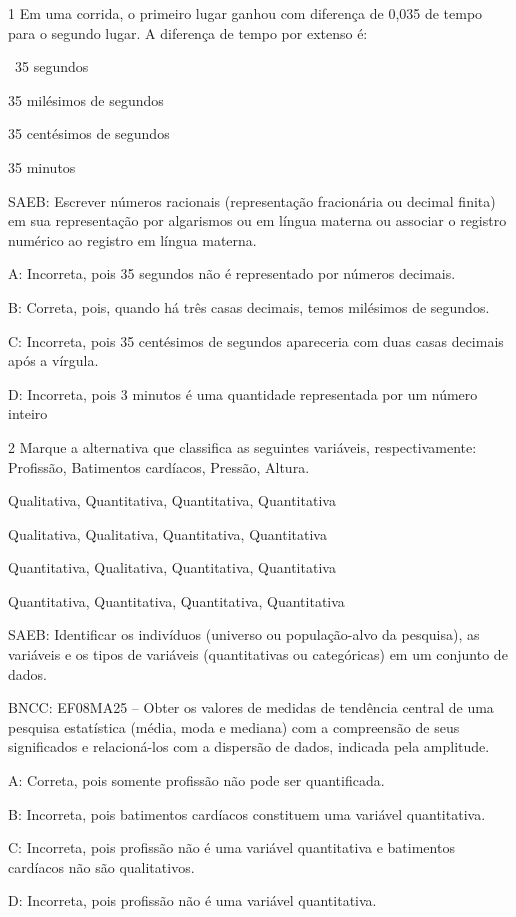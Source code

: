 {\num{1} Em uma corrida, o primeiro lugar ganhou com diferença de 0,035 de
tempo para o segundo lugar. A diferença de tempo por extenso é:
\item~35 segundos
\item 35 milésimos de segundos
\item 35 centésimos de segundos~
\item 35 minutos

SAEB: Escrever números racionais (representação fracionária ou decimal
finita) em sua representação por algarismos ou em língua materna ou
associar o registro numérico ao registro em língua materna.

A: Incorreta, pois 35 segundos não é representado por números decimais.

B: Correta, pois, quando há três casas decimais, temos milésimos de
segundos.

C: Incorreta, pois 35 centésimos de segundos apareceria com duas casas
decimais após a vírgula.

D: Incorreta, pois 3 minutos é uma quantidade representada por um número
inteiro

\num{2} Marque a alternativa que classifica as seguintes variáveis,
respectivamente: Profissão, Batimentos cardíacos, Pressão, Altura.
\item Qualitativa, Quantitativa, Quantitativa, Quantitativa
\item Qualitativa, Qualitativa, Quantitativa, Quantitativa
\item Quantitativa, Qualitativa, Quantitativa, Quantitativa
\item Quantitativa, Quantitativa, Quantitativa, Quantitativa

SAEB: Identificar os indivíduos (universo ou população-alvo da
pesquisa), as variáveis e os tipos de variáveis (quantitativas ou
categóricas) em um conjunto de dados.

BNCC: EF08MA25 -- Obter os valores de medidas de tendência central de
uma pesquisa estatística (média, moda e mediana) com a compreensão de
seus significados e relacioná-los com a dispersão de dados, indicada
pela amplitude.

A: Correta, pois somente profissão não pode ser quantificada.

B: Incorreta, pois batimentos cardíacos constituem uma variável
quantitativa.

C: Incorreta, pois profissão não é uma variável quantitativa e
batimentos cardíacos não são qualitativos.

D: Incorreta, pois profissão não é uma variável quantitativa.

}
